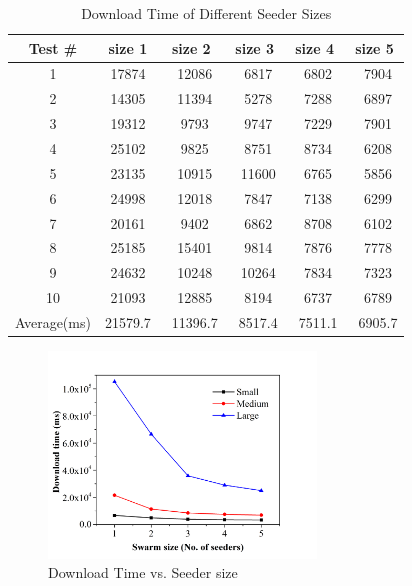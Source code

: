 \documentclass[conference]{IEEEtran}
\begin{document}
	
\begin{table}
	\caption{Download Time of Different Seeder Sizes}
	\begin{center}
		\begin{tabular}{cccccc}
			\hline
			\rule{0pt}{12pt}Test \#  & \rule{0pt}{12pt}size 1   &\rule{0pt}{12pt} size 2  &\rule{0pt}{12pt} size 3 &\rule{0pt}{12pt} size 4 &\rule{0pt}{12pt} size 5\\
			\hline\rule{0pt}{12pt}
			1    &   17874 & \ 	12086 & \ 	6817 & \ 	6802 & \ 	7904 \\
			2    &   14305 & \ 	11394 & \ 	5278 & \ 	7288& \ 	6897 \\
			3    &   19312 & \ 	9793 & \ 	9747 & \ 	7229& \ 	7901 \\
			4    &   25102 & \ 	9825 & \ 	8751  & \ 	8734& \ 	6208\\
			5    &   23135 & \ 	10915 & \ 	11600 & \ 	6765 & \ 	5856\\
			6    &   24998 & \ 	12018 & \ 	7847 & \ 	7138 & \ 	6299\\
			7    &   20161 & \ 	9402 & \ 	6862 & \ 	8708 & \ 	6102\\
			8    &   25185 & \ 	15401 & \ 	9814 & \ 	7876 & \ 	7778\\
			9    &   24632 & \ 	10248 & \ 	10264 & \ 	7834 & \ 	7323\\
			10    &   21093 & \ 	12885 & \ 	8194 & \ 	6737 & \ 	6789\\
			\hline\rule{0pt}{12pt}
			Average(ms)    &   21579.7 & \ 	11396.7 & \ 	8517.4& \ 	7511.1  & \ 	6905.7 \\
			\hline
		\end{tabular}
	\end{center}
\end{table}

\begin{figure}
	\centering
		\includegraphics[width=2.8in]{Graph1.png}
		\caption{Download Time vs. Seeder size}
		\label{fig:side:a}
\end{figure}
\end{document}
